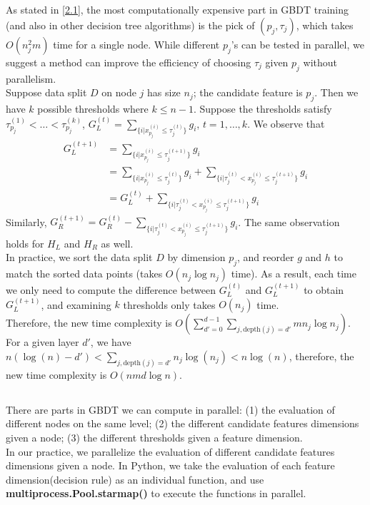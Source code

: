 \documentclass{article}
\begin{document}
    \subsection{}
    As stated in \ref{2.1}, the most computationally expensive part in GBDT training (and also in other decision tree algorithms) is the pick of $(p_j,\tau_j)$, 
    which takes $O(n_j^2m)$ time for a single node.
    While different $p_j$'s can be tested in parallel, we suggest a method can improve the efficiency of choosing $\tau_j$ given $p_j$ without parallelism.
    \vspace{10pt}\\
    Suppose data split $D$ on node $j$ has size $n_j$; the candidate feature is $p_j$. Then we have $k$ possible thresholds where $k\leq n-1$.
    Suppose the thresholds satisfy $\tau_{p_j}^{(1)}<\dots<\tau_{p_j}^{(k)}$, $G_L^{(t)}=\sum_{\{i | x_{p_j}^{(i)}\leq\tau_j^{(t)}\}}g_i$, $t=1,\dots, k$.
    We observe that 
        \begin{align*}
            G_L^{(t+1)}
            &=\sum_{\{i | x_{p_j}^{(i)}\leq\tau_j^{(t+1)}\}}g_i\\
            &=\sum_{\{i | x_{p_j}^{(i)}\leq\tau_j^{(t)}\}}g_i+\sum_{\{i | \tau_j^{(t)}<x_{p_j}^{(i)}\leq\tau_j^{(t+1)}\}}g_i\\
            &=G_L^{(t)}+\sum_{\{i | \tau_j^{(t)}<x_{p_j}^{(i)}\leq\tau_j^{(t+1)}\}}g_i
        \end{align*} 
    Similarly, $G_R^{(t+1)}=G_R^{(t)}-\sum_{\{i | \tau_j^{(t)}<x_{p_j}^{(i)}\leq\tau_j^{(t+1)}\}}g_i$.
    The same observation holds for $H_L$ and $H_R$ as well.
    \vspace{10pt}\\
    In practice, we sort the data split $D$ by dimension $p_j$, and reorder $g$ and $h$ to match the sorted data points (takes $O(n_j\log{n_j})$ time).
    As a result, each time we only need to compute the difference between $G_L^{(t)}$ and $G_L^{(t+1)}$ to obtain $G_L^{(t+1)}$,
    and examining $k$ thresholds only takes $O(n_j)$ time.
    \vspace{10pt}\\
    Therefore, the new time complexity is $O(\sum_{d'=0}^{d-1}\sum_{j,\text{depth}(j)=d'}mn_j\log{n_j})$.
    For a given layer $d'$, we have $n(\log(n)-d')<\sum_{j,\text{depth}(j)=d'} n_j\log(n_j)<n\log(n)$, therefore, the new time complexity is $O(nmd\log{n})$.
    
    \subsection{}
    There are parts in GBDT we can compute in parallel: (1) the evaluation of different nodes on the same level; 
    (2) the different candidate features dimensions given a node; (3) the different thresholds given a feature dimension.
    \vspace{10pt}\\
    In our practice, we parallelize the evaluation of different candidate features dimensions given a node. In Python, we take the evaluation of each feature dimension(decision rule) as an individual function, 
    and use \textbf{multiprocess.Pool.starmap()} to execute the functions in parallel.
\end{document}
